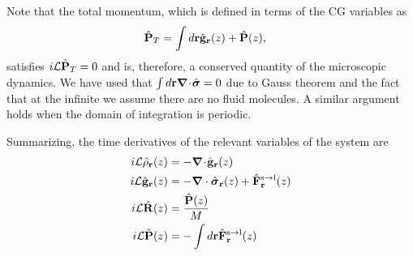 \documentclass[b5paper,openright,10pt]{book}
\newcommand{\esc}{\!\cdot\!}
\begin{document}
Note  that the  total  momentum,  which is  defined  in  terms of  the
CG variables as
\begin{align}
  \hat{\bf P}_T&=\int d{\bf r} \hat{\bf g}_{\bf r}(z)+\hat{\bf P}(z),
\end{align}
satisfies $ i{\cal L}\hat{\bf P}_T=0$ and is, therefore, a conserved quantity
of  the  microscopic   dynamics.   We  have  used   that  $\int  d{\bf
r}\boldsymbol{\nabla}\esc\hat{\boldsymbol{\sigma}}=0$ due to  Gauss theorem  and the  fact
that at the infinite we assume there are no fluid molecules. A similar
argument holds when the domain of integration is periodic.


Summarizing, the time derivatives of the relevant variables of the system are
\begin{align}
  i{\cal L} \hat{\rho}_{\bf r}(z) &= -\boldsymbol{\nabla}\esc\hat{\bf g}_{\bf r}(z)
\nonumber\\
i{\cal L}\hat{\bf g}_{\bf r}(z)
    &=-\boldsymbol{\nabla}\cdot \hat{\boldsymbol{\sigma}}_{\bf r}(z)+\hat{{\bf F}}^{\rm s\to l}_{\bf r}(z) \nonumber \\
i{\cal L}\hat{\bf R}(z) &=\frac{\hat{\bf P}(z)}{M}
  \nonumber\\
  i{\cal L}\hat{\bf P}(z) &=-\int  d{\bf r} \hat{\bf F}^{\rm s\to l}_{\bf r}(z)
   \label{timeDerivatives}  
\end{align}
\end{document}

